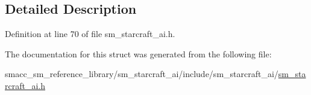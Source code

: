 \subsection{Detailed Description}


Definition at line 70 of file sm\+\_\+starcraft\+\_\+ai.\+h.



The documentation for this struct was generated from the following file\+:\begin{DoxyCompactItemize}
\item 
smacc\+\_\+sm\+\_\+reference\+\_\+library/sm\+\_\+starcraft\+\_\+ai/include/sm\+\_\+starcraft\+\_\+ai/\hyperlink{sm__starcraft__ai_8h}{sm\+\_\+starcraft\+\_\+ai.\+h}\end{DoxyCompactItemize}
